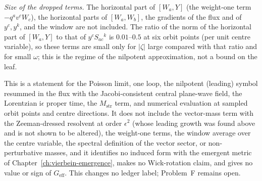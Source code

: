 \emph{Size of the dropped terms.} The horizontal part of \([W_a,Y]\) (the weight-one term \(-q^av^cW_c\)), the horizontal parts of \([W_a,W_b]\), the gradients of the flux and of \(y^c,y^k\), and the window are not included. The ratio of the norm of the horizontal part of \([W_a,Y]\) to that of \(y^cS_{ac}{}^k\) is \(0.01\)--\(0.5\) at six orbit points (per unit centre variable), so these terms are small only for \(|\zeta|\) large compared with that ratio and for small \(\omega\); this is the regime of the nilpotent approximation, not a bound on the leaf.

This is a statement for the Poisson limit, one loop, the nilpotent (leading) symbol resummed in the flux with the Jacobi-consistent central plane-wave field, the Lorentzian \(\mathrm i\epsilon\) proper time, the \(M_{\mathrm{str}}\) term, and numerical evaluation at sampled orbit points and centre directions. It does not include the vector-mass term with the Zeeman-dressed resolvent at order \(\epsilon^2\) (whose leading growth was found above and is not shown to be altered), the weight-one terms, the window average over the centre variable, the spectral definition of the vector sector, or non-perturbative masses, and it identifies no induced form with the emergent metric of Chapter~\ref{ch:vierbein-emergence}, makes no Wick-rotation claim, and gives no value or sign of \(G_{\mathrm{eff}}\). This changes no ledger label; Problem~F remains open.
